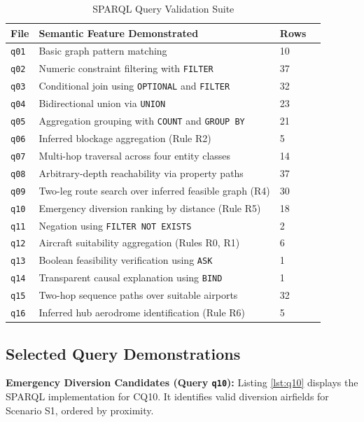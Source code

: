 \documentclass[conference]{IEEEtran}
\begin{document}
\begin{table}[htbp]
\caption{SPARQL Query Validation Suite}
\label{tab:sparql_suite}
\centering
\begin{tabular}{lllc}
\toprule
\textbf{File} & \textbf{Semantic Feature Demonstrated} & \textbf{Rows} \\
\midrule
\texttt{q01} & Basic graph pattern matching & 10 \\
\texttt{q02} & Numeric constraint filtering with \texttt{FILTER} & 37 \\
\texttt{q03} & Conditional join using \texttt{OPTIONAL} and \texttt{FILTER} & 32 \\
\texttt{q04} & Bidirectional union via \texttt{UNION} & 23 \\
\texttt{q05} & Aggregation grouping with \texttt{COUNT} and \texttt{GROUP BY} & 21 \\
\texttt{q06} & Inferred blockage aggregation (Rule R2) & 5 \\
\texttt{q07} & Multi-hop traversal across four entity classes & 14 \\
\texttt{q08} & Arbitrary-depth reachability via property paths & 37 \\
\texttt{q09} & Two-leg route search over inferred feasible graph (R4) & 30 \\
\texttt{q10} & Emergency diversion ranking by distance (Rule R5) & 18 \\
\texttt{q11} & Negation using \texttt{FILTER NOT EXISTS} & 2 \\
\texttt{q12} & Aircraft suitability aggregation (Rules R0, R1) & 6 \\
\texttt{q13} & Boolean feasibility verification using \texttt{ASK} & 1 \\
\texttt{q14} & Transparent causal explanation using \texttt{BIND} & 1 \\
\texttt{q15} & Two-hop sequence paths over suitable airports & 32 \\
\texttt{q16} & Inferred hub aerodrome identification (Rule R6) & 5 \\
\bottomrule
\end{tabular}
\end{table}

\subsection{Selected Query Demonstrations}

\textbf{Emergency Diversion Candidates (Query \texttt{q10}):}
Listing \ref{lst:q10} displays the SPARQL implementation for CQ10. It identifies valid diversion airfields for Scenario S1, ordered by proximity.
\end{document}
